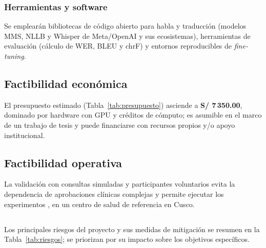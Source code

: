 \subsubsection{Herramientas y software}
Se emplear{\'a}n bibliotecas de c{\'o}digo abierto para habla y traducci{\'o}n (modelos MMS, NLLB y
Whisper de Meta/OpenAI y sus ecosistemas), herramientas de evaluaci{\'o}n (c{\'a}lculo de WER, BLEU y
chrF) y entornos reproducibles de \emph{fine-tuning}.

\subsection{Factibilidad econ{\'o}mica}
El presupuesto estimado (Tabla~\ref{tab:presupuesto}) asciende a \textbf{S/ 7\,350.00}, dominado por
hardware con GPU y cr{\'e}ditos de c{\'o}mputo; es asumible en el marco de un trabajo de tesis y
puede financiarse con recursos propios y/o apoyo institucional.

\subsection{Factibilidad operativa}
La validaci{\'o}n con consultas simuladas y participantes voluntarios evita la dependencia de
aprobaciones cl{\'i}nicas complejas y permite ejecutar los experimentos , en un centro de salud de referencia en Cusco.

\subsection{}
\begin{bloqueObsCuatro}
\noindent Los principales riesgos del proyecto y sus medidas de mitigaci{\'o}n se resumen en la
Tabla~\ref{tab:riesgos}; se priorizan por su impacto sobre los objetivos espec{\'i}ficos.
\end{bloqueObsCuatro}

